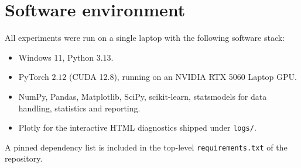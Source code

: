 \section{Software environment}
\label{app:env}

All experiments were run on a single laptop with the following
software stack:
\begin{itemize}[leftmargin=*, itemsep=0.2em]
    \item Windows 11, Python $3.13$.
    \item PyTorch $2.12$ (CUDA 12.8), running on an NVIDIA RTX 5060
    Laptop GPU.
    \item NumPy, Pandas, Matplotlib, SciPy, scikit-learn, statsmodels
    for data handling, statistics and reporting.
    \item Plotly for the interactive HTML diagnostics shipped under
    \texttt{logs/}.
\end{itemize}
A pinned dependency list is included in the top-level
\texttt{requirements.txt} of the repository.

